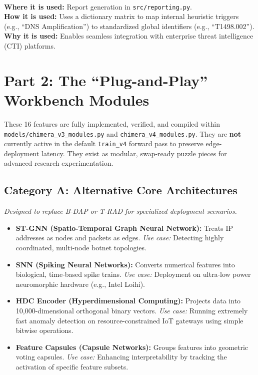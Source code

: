 \documentclass[11pt,a4paper]{article}
\begin{document}
\begin{description}[style=unboxed, leftmargin=0cm]
    \item[\textcolor{primary}{14. MITRE ATT\&CK Mapper (v4)}] \hfill \\
    \textbf{Where it is used:} Report generation in \texttt{src/reporting.py}. \\
    \textbf{How it is used:} Uses a dictionary matrix to map internal heuristic triggers (e.g., ``DNS Amplification'') to standardized global identifiers (e.g., ``T1498.002''). \\
    \textbf{Why it is used:} Enables seamless integration with enterprise threat intelligence (CTI) platforms.
\end{description}

\newpage
\section{Part 2: The ``Plug-and-Play'' Workbench Modules}
These 16 features are fully implemented, verified, and compiled within \texttt{models/chimera\_v3\_modules.py} and \texttt{chimera\_v4\_modules.py}. They are \textbf{not} currently active in the default \texttt{train\_v4} forward pass to preserve edge-deployment latency. They exist as modular, swap-ready puzzle pieces for advanced research experimentation.

\subsection{Category A: Alternative Core Architectures}
\textit{Designed to replace B-DAP or T-RAD for specialized deployment scenarios.}
\begin{itemize}
    \item \textbf{ST-GNN (Spatio-Temporal Graph Neural Network):} Treats IP addresses as nodes and packets as edges. \textit{Use case:} Detecting highly coordinated, multi-node botnet topologies.
    \item \textbf{SNN (Spiking Neural Networks):} Converts numerical features into biological, time-based spike trains. \textit{Use case:} Deployment on ultra-low power neuromorphic hardware (e.g., Intel Loihi).
    \item \textbf{HDC Encoder (Hyperdimensional Computing):} Projects data into 10,000-dimensional orthogonal binary vectors. \textit{Use case:} Running extremely fast anomaly detection on resource-constrained IoT gateways using simple bitwise operations.
    \item \textbf{Feature Capsules (Capsule Networks):} Groups features into geometric voting capsules. \textit{Use case:} Enhancing interpretability by tracking the activation of specific feature subsets.
\end{itemize}
\end{document}
